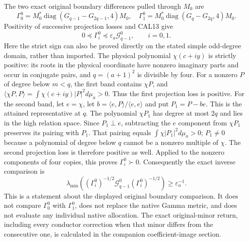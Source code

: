 The two exact original boundary differences pulled through $M_0$ are
\[
 \Gamma_0^0=M_0^*\operatorname{diag}(G_{q-1}-G_{2q-1},4)M_0,
 \quad
 \Gamma_1^0=M_0^*\operatorname{diag}(G_q-G_{2q},4)M_0.
 \tag{CAL16}
\]
Positivity of successive projection losses and CAL13 give
\[
 0\preceq\Gamma_i^0\preceq
       \varepsilon_a\mathcal G_{q-1}^0,\qquad i=0,1.
 \tag{CAL17}
\]
Here the strict sign can also be proved directly on the stated
simple odd-degree domain, rather than imported. The physical
polynomial $\chi(c+iy)$ is strictly positive: its roots in the
physical coordinate have nonzero imaginary parts and occur in
conjugate pairs, and $q=(a+1)^2$ is divisible by four. For a
nonzero $P$ of degree below $m<q$, the first band contains $\chi P$,
and $\langle\chi P,P\rangle=\int\chi(c+iy)|P|^2d\mu_a>0$.
Thus the first projection loss is positive. For the second band,
let $e=\chi$, let $b=\langle e,P\rangle/\langle e,e\rangle$
and put $P_1=P-be$. This is the attained representative at $q$.
The polynomial $\chi P_1$ has degree at most $2q$ and lies in
the high relation space. Since $P_1\perp e$, subtracting the
$e$ component from $\chi P_1$ preserves its pairing with $P_1$.
That pairing equals $\int\chi|P_1|^2d\mu_a>0$; $P_1\ne0$
because a polynomial of degree below $q$ cannot be a nonzero
multiple of $\chi$. The second projection loss is therefore
positive as well. Applied to the nonzero components of four copies,
this proves $\Gamma_i^0\succ0$.
Consequently the exact inverse comparison is
\[
 \lambda_{\min}\!\left((\Gamma_i^0)^{-1/2}
       \mathcal G_{q-1}^0(\Gamma_i^0)^{-1/2}\right)
       \ge\varepsilon_a^{-1}.
 \tag{CAL18}
\]
This is a statement about the displayed original boundary comparison.
It does not compare $\Gamma_0^0$ with $\Gamma_1^0$, does not replace
the native Gamma metric, and does not evaluate any individual
native allocation. The exact original-minor return, including every
conductor correction when that minor differs from the consecutive
one, is calculated in the companion coefficient-image section.
